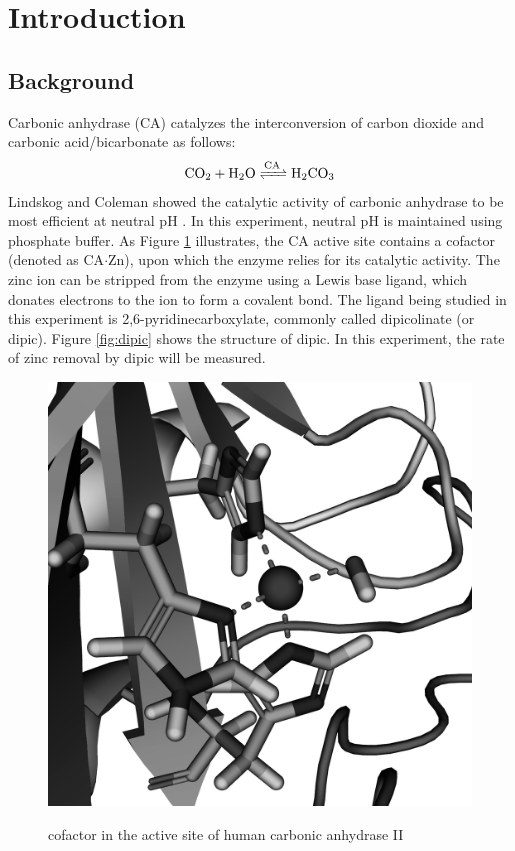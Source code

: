 \section{Introduction}
\subsection{Background}
Carbonic anhydrase (CA) catalyzes the interconversion of carbon dioxide and carbonic acid/bicarbonate as follows:
\begin{align}\label{eqn:ca_reaction}
\ce{CO_2 + H_2O
<=>[\ce{CA}]
H_2CO_3}
\end{align}
Lindskog and Coleman showed the catalytic activity of carbonic anhydrase to be most efficient at neutral pH \cite{bib:ca_ph_dependence}. In this experiment, neutral pH is maintained using phosphate buffer. As Figure \ref{fig:ca_active_site} illustrates, the CA active site contains a  cofactor (denoted as CA$\cdot$Zn), upon which the enzyme relies for its catalytic activity. The zinc ion can be stripped from the enzyme using a Lewis base ligand, which donates electrons to the ion to form a covalent bond. The ligand being studied in this experiment is 2,6-pyridinecarboxylate, commonly called dipicolinate (or dipic). Figure \ref{fig:dipic} shows the structure of dipic. In this experiment, the rate of zinc removal by dipic will be measured.

\begin{figure}[h]
  \includegraphics[width=.9\textwidth]{./Figures/Carbonic_anhydrase_1CA2_active_site_gray.png}\\
  \caption{ cofactor in the active site of human carbonic anhydrase II\cite{bib:pdb_carbonicanhydrase}}\label{fig:ca_active_site}
\end{figure}


